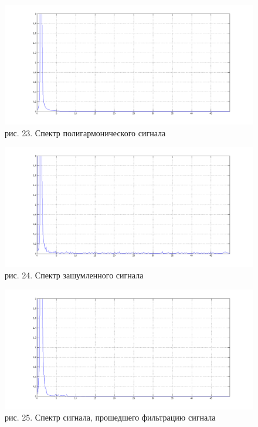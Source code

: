 \documentclass[10pt,a4paper]{report}
\begin{document}
\begin{figure}
\begin{center}
\includegraphics[width=150mm, scale = 0.9]{6_4.png}\newline
рис. 23. Спектр полигармонического сигнала\newline
\end{center}
\end{figure}
\begin{figure}
\begin{center}
\includegraphics[width=150mm, scale = 0.9]{6_5.png}\newline
рис. 24. Спектр зашумленного сигнала\newline
\end{center}
\end{figure}
\begin{figure}
\begin{center}
\includegraphics[width=150mm, scale = 0.9]{6_6.png}\newline
рис. 25. Спектр сигнала, прошедшего фильтрацию сигнала\newline
\end{center}
\end{figure}
\end{document}
